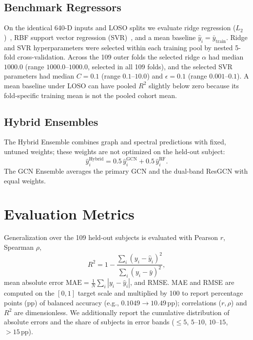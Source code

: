 \documentclass{ieeeaccess}
\newcommand{\pp}{\,\text{pp}}
\begin{document}
\subsection{Benchmark Regressors}

On the identical 640-D inputs and LOSO splits we evaluate ridge regression ($L_2$)~\cite{hoerl1970}, RBF support vector regression (SVR)~\cite{cortes1995}, and a mean baseline $\hat y_i=\bar y_{\text{train}}$. Ridge and SVR hyperparameters were selected within each training pool by nested 5-fold cross-validation. Across the 109 outer folds the selected ridge $\alpha$ had median $1000.0$ (range $1000.0$--$1000.0$, selected in all 109 folds), and the selected SVR parameters had median $C=0.1$ (range $0.1$--$10.0$) and $\epsilon=0.1$ (range $0.001$--$0.1$). A mean baseline under LOSO can have pooled $R^2$ slightly below zero because its fold-specific training mean is not the pooled cohort mean.

\subsection{Hybrid Ensembles}

The Hybrid Ensemble combines graph and spectral predictions with fixed, untuned weights; these weights are not optimized on the held-out subject:
\begin{equation}
\hat y^{\text{Hybrid}}_i=0.5\,\hat y^{\text{GCN}}_i+0.5\,\hat y^{\text{RF}}_i .
\end{equation}
The GCN Ensemble averages the primary GCN and the dual-band ResGCN with equal weights.

\section{Evaluation Metrics}

Generalization over the 109 held-out subjects is evaluated with Pearson $r$, Spearman $\rho$,
\begin{equation}
R^2=1-\frac{\sum_{i}(y_i-\hat y_i)^2}{\sum_i(y_i-\bar y)^2},
\end{equation}
mean absolute error $\text{MAE}=\frac1N\sum_i|y_i-\hat y_i|$, and RMSE. MAE and RMSE are computed on the $[0,1]$ target scale and multiplied by 100 to report percentage points (pp) of balanced accuracy (e.g., $0.1049\rightarrow10.49\pp$); correlations ($r, \rho$) and $R^2$ are dimensionless. We additionally report the cumulative distribution of absolute errors and the share of subjects in error bands ($\le5$, $5$--$10$, $10$--$15$, $>15\pp$).
\end{document}
